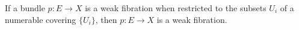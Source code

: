 If a bundle $p \colon E \to X$ is a weak fibration when restricted to the subsets $U_i$ of a numerable covering $\{U_i\}$, then $p \colon E \to X$ is a weak fibration.
